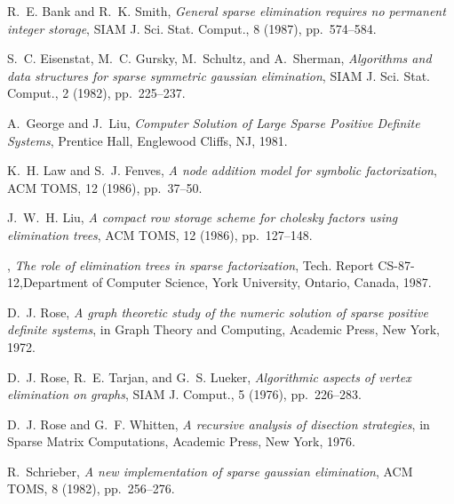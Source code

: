 \documentclass[twoside,leqno,twocolumn]{article}
\begin{document}
\begin{thebibliography}{99}



R.~E. Bank and R.~K. Smith, {\em General sparse elimination requires no
  permanent integer storage}, SIAM J. Sci. Stat. Comput., 8 (1987),
  pp.~574--584.

S.~C. Eisenstat, M.~C. Gursky, M.~Schultz, and A.~Sherman, {\em
  Algorithms and data structures for sparse symmetric gaussian elimination},
  SIAM J. Sci. Stat. Comput., 2 (1982), pp.~225--237.

A.~George and J.~Liu, {\em Computer Solution of Large Sparse Positive
  Definite Systems}, Prentice Hall, Englewood Cliffs, NJ, 1981.

K.~H. Law and S.~J. Fenves, {\em A node addition model for symbolic
  factorization}, ACM TOMS, 12 (1986), pp.~37--50.

J.~W.~H. Liu, {\em A compact row storage scheme for cholesky factors
  using elimination trees}, ACM TOMS, 12 (1986), pp.~127--148.

\sameauthor , {\em The role of
  elimination trees in sparse factorization}, Tech. Report CS-87-12,Department
  of Computer Science, York University, Ontario, Canada, 1987.

D.~J. Rose, {\em A graph theoretic study of the numeric solution of
  sparse positive definite systems}, in Graph Theory and Computing, Academic  Press, New
York, 1972.

D.~J. Rose, R.~E. Tarjan, and G.~S. Lueker, {\em Algorithmic aspects of
  vertex elimination on graphs}, SIAM J. Comput., 5 (1976), pp.~226--283.

D.~J. Rose and G.~F. Whitten, {\em A recursive analysis of disection
  strategies}, in Sparse Matrix Computations, Academic Press, New York, 1976.

R.~Schrieber, {\em A new implementation of sparse gaussian elimination},
  ACM TOMS, 8 (1982), pp.~256--276.

\end{thebibliography}
\end{document}
